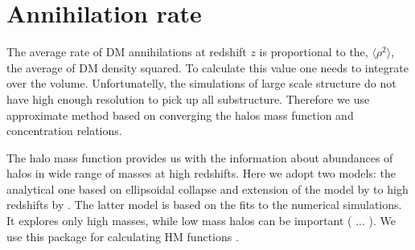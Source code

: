 \section{Annihilation rate}

The average rate of DM annihilations at redshift $z$ is proportional to the, $\langle \rho^2 \rangle$, the average of DM density squared. To calculate this value one needs to integrate over the volume. Unfortunatelly, the simulations of large scale structure do not have high enough resolution to pick up all substructure. Therefore we use approximate method based on converging the halos mass function and concentration relations.

The halo mass function provides us with the information about abundances of halos in wide range of masses at high redshifts. Here we adopt two models: the analytical one based on ellipsoidal collapse \cite{Sheth_2001} and extension of the model by \cite{Tinker_2008} to high redshifts by \cite{Behroozi_2013}. The latter model is based on the fits to the numerical simulations. It explores only high masses, while low mass halos can be important ( ... ). We use this package for calculating HM functions \cite{Murray_2013}.

